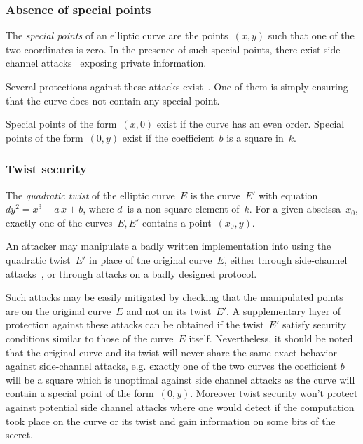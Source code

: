 \documentclass[twocolumn,letterpaper,10pt]{article}
\begin{document}
\subsubsection{Absence of special points}
\label{sss:special-points}

The \emph{special points} of an elliptic curve
are the points~$(x,y)$ such that one of the two coordinates is zero.
In the presence of such special points,
there exist side-channel attacks~\cite{pkc2003goubin}
exposing private information.

Several protections against these attacks exist~\cite{ches2004mmm}.
One of them is simply ensuring that the curve does not contain
any special point.

Special points of the form~$(x, 0)$ exist if the curve has
an even order.
Special points of the form~$(0, y)$ exist if the coefficient~$b$
is a square in~$k$.

\subsubsection{Twist security}
\label{sss:twist}

The \emph{quadratic twist} of the elliptic curve~$E$
is the curve~$E'$ with equation~$d y^2 = x^3 + a\,x + b$,
where $d$~is a non-square element of~$k$.
For a given abscissa~$x_0$,
exactly one of the curves~$E, E'$ contains a point~$(x_0, y)$.

An attacker may manipulate a badly written implementation
into using the quadratic twist~$E'$
in place of the original curve~$E$,
either through side-channel attacks~\cite{fdtc2008flrv},
or through attacks on a badly designed protocol.

Such attacks may be easily mitigated by checking
that the manipulated points are on the original curve~$E$
and not on its twist~$E'$.
A supplementary layer of protection against these attacks
can be obtained if the twist~$E'$ satisfy
security conditions similar to those of the curve~$E$ itself.
Nevertheless, it should be noted that the original curve and
its twist will never share the same exact behavior against
side-channel attacks, e.g. exactly one of the two curves the coefficient $b$
will be a square which is unoptimal against side channel attacks
as the curve will contain a special point of the form~$(0, y)$.
Moreover twist security won't protect against potential side channel attacks
where one would detect if the computation took place on the curve or its twist
and gain information on some bits of the secret.
\end{document}
